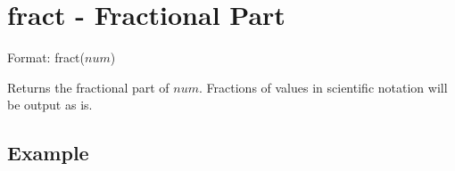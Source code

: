 
%

\section{fract - Fractional Part\label{sect:fract}}

Format: fract($num$)

Returns the fractional part of $num$. Fractions of values in scientific notation will be output as is. 


\subsection*{Example}


%

